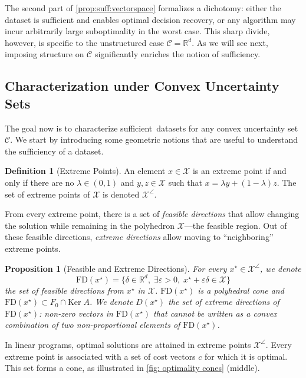 \documentclass[11pt]{article}
\theoremstyle{plain}
\newtheorem{proposition}{Proposition}
\theoremstyle{definition}
\newtheorem{definition}{Definition}
\newcommand{\R}[0]{\mathbb R}
\newcommand{\Ker}[0]{\mathrm{Ker}\;}
\newcommand{\suff}{sufficient}
\newcommand{\FD}{\mathrm{FD}}
\newcommand{\OB}[1]{\noindent{\textcolor{blue}{\{{\textbf{OB}:} #1\}}}}
\newcommand{\cX}{\mathcal{X}}
\newcommand{\cC}{\mathcal{C}}
\newcommand{\cD}{\mathcal{D}}
\begin{document}
The second part of \cref{prop:suff:vectorspace} formalizes a dichotomy: either the dataset is sufficient and enables optimal decision recovery, or any algorithm may incur arbitrarily large suboptimality in the worst case. This sharp divide, however, is specific to the unstructured case \(\mathcal{C} = \mathbb{R}^d\). As we will see next, imposing structure on \(\mathcal{C}\) significantly enriches the notion of sufficiency.  %

\subsection{Characterization under Convex Uncertainty Sets}

The goal now is to characterize \suff\ datasets for any convex uncertainty set $\cC$. We start by introducing some geometric notions that are useful to understand the sufficiency of a dataset.

\begin{definition}[Extreme Points]
An element $x\in \cX$ is an extreme point if and only if there are no $\lambda \in (0,1)$ and $y,z\in \cX$ such that $x=\lambda y + (1-\lambda)z$. The set of extreme points of $\cX$ is denoted $\cX^\angle$.
\end{definition}

From every extreme point, there is a set of \textit{feasible directions} that allow changing the solution while remaining in the polyhedron $\cX$---the feasible region. Out of these feasible directions, \textit{extreme directions} allow moving to ``neighboring'' extreme points.

\begin{proposition}[Feasible and Extreme Directions] \label{feasible directions polyhedral cone}
     For every $x^\star\in \cX^\angle$, we denote $$\FD(x^\star)=\{\delta \in \R^d,\; \exists \varepsilon>0,\;x^\star +\varepsilon \delta \in \cX\}$$
     the set of feasible directions from $x^\star$ in $\cX$. $\FD(x^\star)$ is a polyhedral cone and $\FD(x^\star)\subset F_0 \cap \Ker A$. We denote $D(x^\star)$ the set of extreme directions of $\FD(x^\star)$: non-zero vectors in $\FD(x^\star)$ that cannot be written as a convex combination of two non-proportional elements of $\FD(x^\star)$.
     
\end{proposition}
In linear programs, optimal solutions are attained in extreme points $\cX^\angle$.
Every extreme point is associated with a set of cost vectors $c$ for which it is optimal. This set forms a cone, as illustrated in \cref{fig: optimality cones} (middle).
\end{document}
